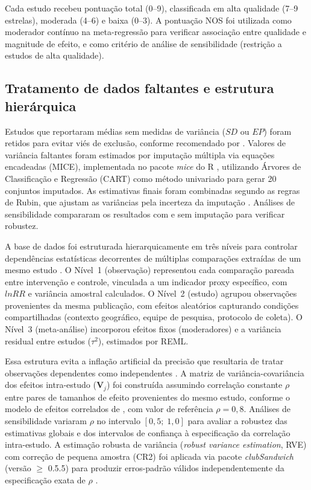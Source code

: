 Cada estudo recebeu pontuação total (0--9), classificada em alta qualidade (7--9 estrelas), moderada (4--6) e baixa (0--3). A pontuação NOS foi utilizada como moderador contínuo na meta-regressão para verificar associação entre qualidade e magnitude de efeito, e como critério de análise de sensibilidade (restrição a estudos de alta qualidade).

\subsection{Tratamento de dados faltantes e estrutura hierárquica}
\label{sec:missing_cap2}

Estudos que reportaram médias sem medidas de variância ($SD$ ou $EP$) foram retidos para evitar viés de exclusão, conforme recomendado por . Valores de variância faltantes foram estimados por imputação múltipla via equações encadeadas (MICE), implementada no pacote \textit{mice} do R \cite{vanBuuren2011}, utilizando Árvores de Classificação e Regressão (CART) como método univariado para gerar 20 conjuntos imputados. As estimativas finais foram combinadas segundo as regras de Rubin, que ajustam as variâncias pela incerteza da imputação \cite{Rubin1987}. Análises de sensibilidade compararam os resultados com e sem imputação para verificar robustez. 

A base de dados foi estruturada hierarquicamente em três níveis para controlar dependências estatísticas decorrentes de múltiplas comparações extraídas de um mesmo estudo \cite{Pustejovsky2022}. O Nível~1 (observação) representou cada comparação pareada entre intervenção e controle, vinculada a um indicador proxy específico, com $lnRR$ e variância amostral calculados. O Nível~2 (estudo) agrupou observações provenientes da mesma publicação, com efeitos aleatórios capturando condições compartilhadas (contexto geográfico, equipe de pesquisa, protocolo de coleta). O Nível~3 (meta-análise) incorporou efeitos fixos (moderadores) e a variância residual entre estudos ($\tau^2$), estimados por REML. 

Essa estrutura evita a inflação artificial da precisão que resultaria de tratar observações dependentes como independentes \cite{Cheung2014}. A matriz de variância-covariância dos efeitos intra-estudo ($\mathbf{V}_j$) foi construída assumindo correlação constante $\rho$ entre pares de tamanhos de efeito provenientes do mesmo estudo, conforme o modelo de efeitos correlados de , com valor de referência $\rho = 0{,}8$. Análises de sensibilidade variaram $\rho$ no intervalo $[0{,}5;\; 1{,}0]$ para avaliar a robustez das estimativas globais e dos intervalos de confiança à especificação da correlação intra-estudo. A estimação robusta de variância (\textit{robust variance estimation}, RVE) com correção de pequena amostra (CR2) foi aplicada via pacote \textit{clubSandwich} (versão $\geq$ 0.5.5) para produzir erros-padrão válidos independentemente da especificação exata de $\rho$ \cite{Pustejovsky2022}.

